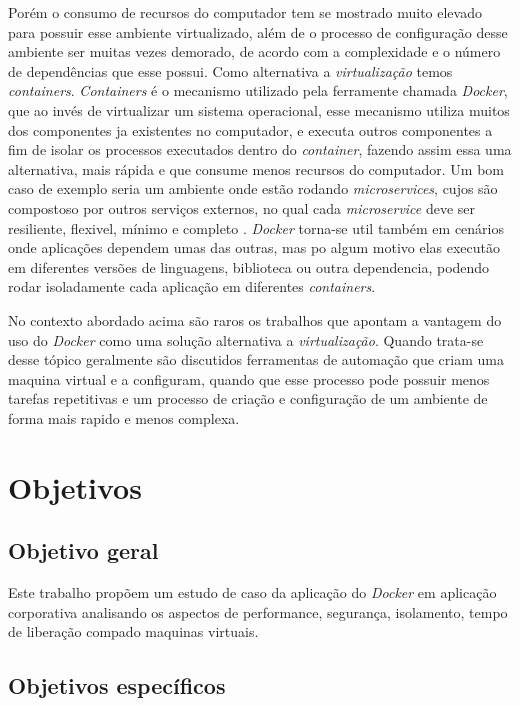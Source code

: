 \documentclass[11pt,a4paper]{article}
\begin{document}
Porém o consumo de recursos do computador tem se mostrado muito elevado para possuir esse ambiente virtualizado,
além de o processo de configuração desse ambiente ser muitas vezes demorado, de acordo com a complexidade e
o número de dependências que esse possui. Como alternativa a \textit{virtualização} temos \textit{containers}.
\textit{Containers} é o mecanismo utilizado pela ferramente chamada \textit{Docker}, que ao invés de virtualizar
um sistema operacional, esse mecanismo utiliza muitos dos componentes ja existentes no computador, e executa
outros componentes a fim de isolar os processos executados dentro do \textit{container}\cite{TW_docker_for_builds},
fazendo assim essa uma alternativa, mais rápida e que consume menos recursos do computador\cite{DZone_CD_guide_v3}.
Um bom caso de exemplo seria um ambiente onde estão rodando \textit{microservices}, cujos são compostoso por
outros serviços externos, no qual cada \textit{microservice} deve ser resiliente, flexivel, mínimo e completo
\cite{Bugwadia_arch_constrains}. \textit{Docker} torna-se util também em cenários onde aplicações dependem umas
das outras, mas po algum motivo elas executão em diferentes versões de linguagens, biblioteca ou outra dependencia,
podendo rodar isoladamente cada aplicação em diferentes \textit{containers}\cite{Merkel_Docker}.

No contexto abordado acima são raros os trabalhos que apontam a vantagem do uso do \textit{Docker} como uma solução
alternativa a \textit{virtualização}\cite{Jafari_infra_as_a_code}. Quando trata-se desse tópico geralmente são
discutidos ferramentas de automação que criam uma maquina virtual e a configuram, quando que esse processo
pode possuir menos tarefas repetitivas e um processo de criação e configuração de um ambiente de forma mais
rapido e menos complexa.

\section{Objetivos}\label{sec:objetivos}

\subsection{Objetivo geral}

Este trabalho propõem um estudo de caso da aplicação do \textit{Docker} em aplicação corporativa analisando os aspectos
de performance, segurança, isolamento, tempo de liberação compado maquinas virtuais.

\subsection{Objetivos específicos}
\end{document}
